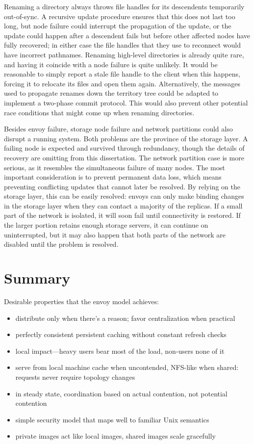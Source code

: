 Renaming a directory always throws file handles for its descendents temporarily out-of-sync. A recursive update procedure ensures that this does not last too long, but node failure could interrupt the propagation of the update, or the update could happen after a descendent fails but before other affected nodes have fully recovered; in either case the file handles that they use to reconnect would have incorrect pathnames. Renaming high-level directories is already quite rare, and having it coincide with a node failure is quite unlikely. It would be reasonable to simply report a stale file handle to the client when this happens, forcing it to relocate its files and open them again. Alternatively, the messages used to propagate renames down the territory tree could be adapted to implement a two-phase commit protocol. This would also prevent other potential race conditions that might come up when renaming directories.

Besides envoy failure, storage node failure and network partitions could also disrupt a running system. Both problems are the province of the storage layer. A failing node is expected and survived through redundancy, though the details of recovery are omitting from this dissertation. The network partition case is more serious, as it resembles the simultaneous failure of many nodes. The most important consideration is to prevent permanent data loss, which means preventing conflicting updates that cannot later be resolved. By relying on the storage layer, this can be easily resolved: envoys can only make binding changes in the storage layer when they can contact a majority of the replicas. If a small part of the network is isolated, it will soon fail until connectivity is restored. If the larger portion retains enough storage servers, it can continue on uninterrupted, but it may also happen that both parts of the network are disabled until the problem is resolved.

\section{Summary}

Desirable properties that the envoy model achieves:

\begin{itemize}
\item distribute only when there's a reason; favor centralization when practical
\item perfectly consistent persistent caching without constant refresh checks
\item local impact---heavy users bear most of the load, non-users none of it
\item serve from local machine cache when uncontended, NFS-like when shared: requests never require topology changes
\item in steady state, coordination based on actual contention, not potential contention
\item simple security model that maps well to familiar Unix semantics
\item private images act like local images, shared images scale gracefully
\end{itemize}

